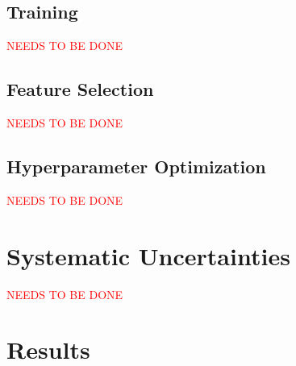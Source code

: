 	\subsection{Training}{
	\textcolor{red}{NEEDS TO BE DONE}

	}

	\subsection{Feature Selection}{
	\textcolor{red}{NEEDS TO BE DONE}

	}

	\subsection{Hyperparameter Optimization}{
	\textcolor{red}{NEEDS TO BE DONE}

	}

\section{Systematic Uncertainties}{
	\textcolor{red}{NEEDS TO BE DONE}
}

\section{Results}{

}

